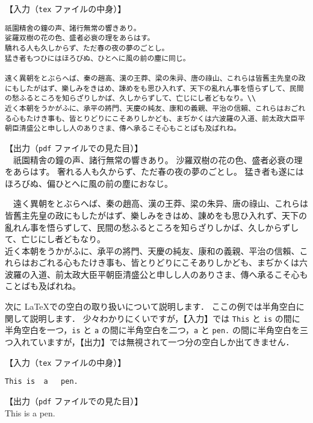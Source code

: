 \begin{tcolorbox}[title=改行・改段落]
【入力（\verb|tex| ファイルの中身）】
\begin{verbatim}
祇園精舍の鐘の声、諸行無常の響きあり。
娑羅双樹の花の色、盛者必衰の理をあらはす。
驕れる人も久しからず、ただ春の夜の夢のごとし。
猛き者もつひにはほろびぬ、ひとへに風の前の塵に同じ。

遠く異朝をとぶらへば、秦の趙高、漢の王莽、梁の朱异、唐の祿山、これらは皆舊主先皇の政にもしたがはず、樂しみをきはめ、諌めをも思ひ入れず、天下の亂れん事を悟らずして、民間の愁ふるところを知らざりしかば、久しからずして、亡じにし者どもなり。\\
近く本朝をうかがふに、承平の將門、天慶の純友、康和の義親、平治の信賴、これらはおごれる心もたけき事も、皆とりどりにこそありしかども、まぢかくは六波羅の入道、前太政大臣平朝臣清盛公と申しし人のありさま、傳へ承るこそ心もことばも及ばれね。
\end{verbatim}
\tcblower
【出力（\verb|pdf| ファイルでの見た目）】\\
　祇園精舎の鐘の声、諸行無常の響きあり。
沙羅双樹の花の色、盛者必衰の理をあらはす。
奢れる人も久からず、ただ春の夜の夢のごとし。
猛き者も遂にはほろびぬ、偏ひとへに風の前の塵におなじ。

　遠く異朝をとぶらへば、秦の趙高、漢の王莽、梁の朱异、唐の祿山、これらは皆舊主先皇の政にもしたがはず、樂しみをきはめ、諌めをも思ひ入れず、天下の亂れん事を悟らずして、民間の愁ふるところを知らざりしかば、久しからずして、亡じにし者どもなり。\\
近く本朝をうかがふに、承平の將門、天慶の純友、康和の義親、平治の信賴、これらはおごれる心もたけき事も、皆とりどりにこそありしかども、まぢかくは六波羅の入道、前太政大臣平朝臣清盛公と申しし人のありさま、傳へ承るこそ心もことばも及ばれね。
\end{tcolorbox}

次に \LaTeX での空白の取り扱いについて説明します．
ここの例では半角空白に関して説明します．
少々わかりにくいですが，【入力】では \verb|This| と \verb|is| の間に半角空白を一つ，\verb|is| と \verb|a| の間に半角空白を二つ，\verb|a| と \verb|pen.| の間に半角空白を三つ入れていますが，【出力】では無視されて一つ分の空白しか出てきません．

\begin{tcolorbox}[title={空白の処理}]
【入力（\verb|tex| ファイルの中身）】
\begin{verbatim}
This is  a   pen.
\end{verbatim}
\tcblower
【出力（\verb|pdf| ファイルでの見た目）】\\
This is a pen.
\end{tcolorbox}

